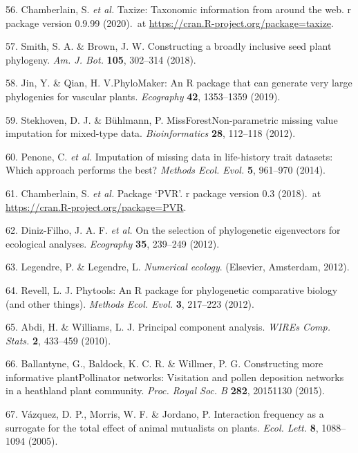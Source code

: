 \documentclass[12pt,a4paper,]{article}
\begin{document}
\hypertarget{ref-chamberlain2020}{}
56. Chamberlain, S. \emph{et al.} Taxize: Taxonomic information from
around the web. r package version 0.9.99 (2020).~at
\href{https://CRAN.R-project.org/package=taxize}{https://cran.R-project.org/package=taxize}.

\hypertarget{ref-smith2018}{}
57. Smith, S. A. \& Brown, J. W. Constructing a broadly inclusive seed
plant phylogeny. \emph{Am. J. Bot.} \textbf{105}, 302--314 (2018).

\hypertarget{ref-jin2019}{}
58. Jin, Y. \& Qian, H. V.PhyloMaker: An R package that can generate
very large phylogenies for vascular plants. \emph{Ecography}
\textbf{42}, 1353--1359 (2019).

\hypertarget{ref-stekhoven2012}{}
59. Stekhoven, D. J. \& Bühlmann, P. MissForestNon-parametric missing
value imputation for mixed-type data. \emph{Bioinformatics} \textbf{28},
112--118 (2012).

\hypertarget{ref-penone2014}{}
60. Penone, C. \emph{et al.} Imputation of missing data in life-history
trait datasets: Which approach performs the best? \emph{Methods Ecol.
Evol.} \textbf{5}, 961--970 (2014).

\hypertarget{ref-santos2018}{}
61. Chamberlain, S. \emph{et al.} Package `PVR'. r package version 0.3
(2018).~at
\href{https://CRAN.R-project.org/package=PVR}{https://cran.R-project.org/package=PVR}.

\hypertarget{ref-diniz-filho2012}{}
62. Diniz-Filho, J. A. F. \emph{et al.} On the selection of phylogenetic
eigenvectors for ecological analyses. \emph{Ecography} \textbf{35},
239--249 (2012).

\hypertarget{ref-legendre2012}{}
63. Legendre, P. \& Legendre, L. \emph{Numerical ecology}. (Elsevier,
Amsterdam, 2012).

\hypertarget{ref-revell2012}{}
64. Revell, L. J. Phytools: An R package for phylogenetic comparative
biology (and other things). \emph{Methods Ecol. Evol.} \textbf{3},
217--223 (2012).

\hypertarget{ref-abdi2010}{}
65. Abdi, H. \& Williams, L. J. Principal component analysis.
\emph{WIREs Comp. Stats.} \textbf{2}, 433--459 (2010).

\hypertarget{ref-ballantyne2015}{}
66. Ballantyne, G., Baldock, K. C. R. \& Willmer, P. G. Constructing
more informative plantPollinator networks: Visitation and pollen
deposition networks in a heathland plant community. \emph{Proc. Royal
Soc. B} \textbf{282}, 20151130 (2015).

\hypertarget{ref-vazquez2005}{}
67. Vázquez, D. P., Morris, W. F. \& Jordano, P. Interaction frequency
as a surrogate for the total effect of animal mutualists on plants.
\emph{Ecol. Lett.} \textbf{8}, 1088--1094 (2005).
\end{document}
